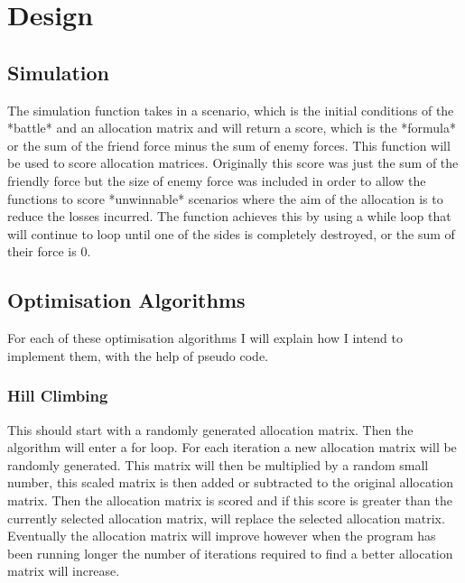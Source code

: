 \chapter{Design} \label{Chapter:three}

\section{Simulation}

The simulation function takes in a scenario, which is the initial conditions of the *battle* and an allocation matrix and will return a score, which is the *formula* or the sum of the friend force minus the sum of enemy forces. This function will be used to score allocation matrices. Originally this score was just the sum of the friendly force but the size of enemy force was included in order to allow the functions to score *unwinnable* scenarios where the aim of the allocation is to reduce the losses incurred. The function achieves this by using a while loop that will continue to loop until one of the sides is completely destroyed, or the sum of their force is 0.

\section{Optimisation Algorithms}

For each of these optimisation algorithms I will explain how I intend to implement them, with the help of pseudo code.

\subsection{Hill Climbing}

This should start with a randomly generated allocation matrix. Then the algorithm will enter a for loop. For each iteration a new allocation matrix will be randomly generated. This matrix will then be multiplied by a random small number, this scaled matrix is then added or subtracted to the original allocation matrix. Then the allocation matrix is scored and if this score is greater than the currently selected allocation matrix, will replace the selected allocation matrix. Eventually the allocation matrix will improve however when the program has been running longer the number of iterations required to find a better allocation matrix will increase.

